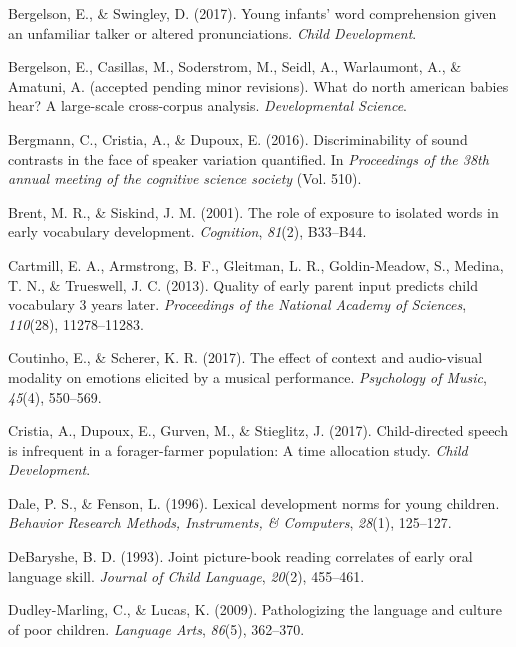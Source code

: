 \documentclass[man]{apa6}
\theoremstyle{definition}
\theoremstyle{definition}
\theoremstyle{definition}
\theoremstyle{remark}
\begin{document}
\hypertarget{ref-bergelson2017young}{}
Bergelson, E., \& Swingley, D. (2017). Young infants' word comprehension
given an unfamiliar talker or altered pronunciations. \emph{Child
Development}.

\hypertarget{ref-bergelsonunderreview}{}
Bergelson, E., Casillas, M., Soderstrom, M., Seidl, A., Warlaumont, A.,
\& Amatuni, A. (accepted pending minor revisions). What do north
american babies hear? A large-scale cross-corpus analysis.
\emph{Developmental Science}.

\hypertarget{ref-bergmann2016discriminability}{}
Bergmann, C., Cristia, A., \& Dupoux, E. (2016). Discriminability of
sound contrasts in the face of speaker variation quantified. In
\emph{Proceedings of the 38th annual meeting of the cognitive science
society} (Vol. 510).

\hypertarget{ref-brent2001role}{}
Brent, M. R., \& Siskind, J. M. (2001). The role of exposure to isolated
words in early vocabulary development. \emph{Cognition}, \emph{81}(2),
B33--B44.

\hypertarget{ref-cartmill2013quality}{}
Cartmill, E. A., Armstrong, B. F., Gleitman, L. R., Goldin-Meadow, S.,
Medina, T. N., \& Trueswell, J. C. (2013). Quality of early parent input
predicts child vocabulary 3 years later. \emph{Proceedings of the
National Academy of Sciences}, \emph{110}(28), 11278--11283.

\hypertarget{ref-coutinho2017effect}{}
Coutinho, E., \& Scherer, K. R. (2017). The effect of context and
audio-visual modality on emotions elicited by a musical performance.
\emph{Psychology of Music}, \emph{45}(4), 550--569.

\hypertarget{ref-cristia2017child}{}
Cristia, A., Dupoux, E., Gurven, M., \& Stieglitz, J. (2017).
Child-directed speech is infrequent in a forager-farmer population: A
time allocation study. \emph{Child Development}.

\hypertarget{ref-dale1996lexical}{}
Dale, P. S., \& Fenson, L. (1996). Lexical development norms for young
children. \emph{Behavior Research Methods, Instruments, \& Computers},
\emph{28}(1), 125--127.

\hypertarget{ref-debaryshe1993joint}{}
DeBaryshe, B. D. (1993). Joint picture-book reading correlates of early
oral language skill. \emph{Journal of Child Language}, \emph{20}(2),
455--461.

\hypertarget{ref-dudley2009pathologizing}{}
Dudley-Marling, C., \& Lucas, K. (2009). Pathologizing the language and
culture of poor children. \emph{Language Arts}, \emph{86}(5), 362--370.
\end{document}
